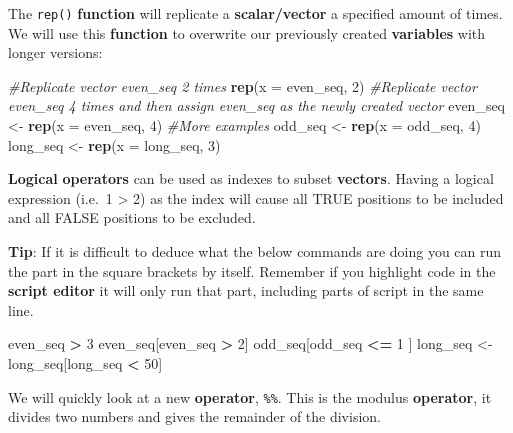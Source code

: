 \documentclass[]{book}
\newenvironment{Shaded}{\begin{snugshade}}{\end{snugshade}}
\newcommand{\KeywordTok}[1]{\textcolor[rgb]{0.13,0.29,0.53}{\textbf{#1}}}
\newcommand{\DataTypeTok}[1]{\textcolor[rgb]{0.13,0.29,0.53}{#1}}
\newcommand{\DecValTok}[1]{\textcolor[rgb]{0.00,0.00,0.81}{#1}}
\newcommand{\StringTok}[1]{\textcolor[rgb]{0.31,0.60,0.02}{#1}}
\newcommand{\CommentTok}[1]{\textcolor[rgb]{0.56,0.35,0.01}{\textit{#1}}}
\newcommand{\OperatorTok}[1]{\textcolor[rgb]{0.81,0.36,0.00}{\textbf{#1}}}
\newcommand{\NormalTok}[1]{#1}
\begin{document}
The \texttt{rep()} \textbf{function} will replicate a
\textbf{scalar/vector} a specified amount of times. We will use this
\textbf{function} to overwrite our previously created \textbf{variables}
with longer versions:

\begin{Shaded}
\begin{Highlighting}[]
\CommentTok{#Replicate vector even_seq 2 times}
\KeywordTok{rep}\NormalTok{(}\DataTypeTok{x =}\NormalTok{ even_seq, }\DecValTok{2}\NormalTok{)}
\CommentTok{#Replicate vector even_seq 4 times and then assign even_seq as the newly created vector}
\NormalTok{even_seq <-}\StringTok{ }\KeywordTok{rep}\NormalTok{(}\DataTypeTok{x =}\NormalTok{ even_seq, }\DecValTok{4}\NormalTok{)}
\CommentTok{#More examples}
\NormalTok{odd_seq <-}\StringTok{ }\KeywordTok{rep}\NormalTok{(}\DataTypeTok{x =}\NormalTok{ odd_seq, }\DecValTok{4}\NormalTok{)}
\NormalTok{long_seq <-}\StringTok{ }\KeywordTok{rep}\NormalTok{(}\DataTypeTok{x =}\NormalTok{ long_seq, }\DecValTok{3}\NormalTok{)}
\end{Highlighting}
\end{Shaded}

\textbf{Logical} \textbf{operators} can be used as indexes to subset
\textbf{vectors}. Having a logical expression (i.e.~1 \textgreater{} 2)
as the index will cause all TRUE positions to be included and all FALSE
positions to be excluded.

\textbf{Tip}: If it is difficult to deduce what the below commands are
doing you can run the part in the square brackets by itself. Remember if
you highlight code in the \textbf{script editor} it will only run that
part, including parts of script in the same line.

\begin{Shaded}
\begin{Highlighting}[]
\NormalTok{even_seq }\OperatorTok{>}\StringTok{ }\DecValTok{3}
\NormalTok{even_seq[even_seq  }\OperatorTok{>}\StringTok{ }\DecValTok{2}\NormalTok{]}
\NormalTok{odd_seq[odd_seq }\OperatorTok{<=}\StringTok{ }\DecValTok{1}\NormalTok{ ]}
\NormalTok{long_seq <-}\StringTok{ }\NormalTok{long_seq[long_seq }\OperatorTok{<}\StringTok{ }\DecValTok{50}\NormalTok{]}
\end{Highlighting}
\end{Shaded}

We will quickly look at a new \textbf{operator}, \texttt{\%\%}. This is
the modulus \textbf{operator}, it divides two numbers and gives the
remainder of the division.
\end{document}
